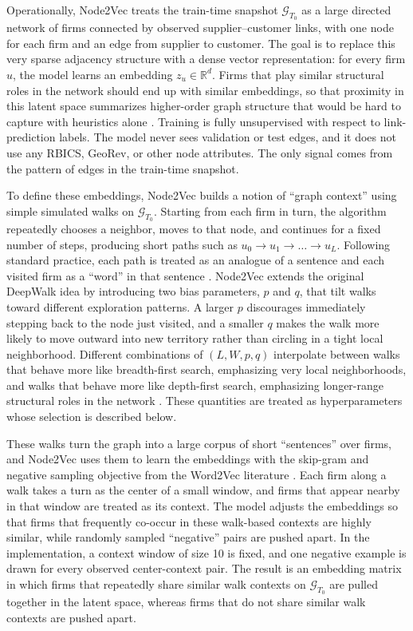 Operationally, Node2Vec treats the train-time snapshot \(\mathcal{G}_{T_0}\) as a large directed network of firms connected by observed supplier--customer links, with one node for each firm and an edge from supplier to customer. The goal is to replace this very sparse adjacency structure with a dense vector representation: for every firm \(u\), the model learns an embedding \(z_u \in \mathbb{R}^d\). Firms that play similar structural roles in the network should end up with similar embeddings, so that proximity in this latent space summarizes higher-order graph structure that would be hard to capture with heuristics alone \parencite{grover_node2vec_2016,hamilton_representation_2017,cai_comprehensive_2018}. Training is fully unsupervised with respect to link-prediction labels. The model never sees validation or test edges, and it does not use any RBICS, GeoRev, or other node attributes. The only signal comes from the pattern of edges in the train-time snapshot.

To define these embeddings, Node2Vec builds a notion of ``graph context'' using simple simulated walks on \(\mathcal{G}_{T_0}\). Starting from each firm in turn, the algorithm repeatedly chooses a neighbor, moves to that node, and continues for a fixed number of steps, producing short paths such as \(u_0 \rightarrow u_1 \rightarrow \dots \rightarrow u_L\). Following standard practice, each path is treated as an analogue of a sentence and each visited firm as a ``word'' in that sentence \parencite{perozzi_deepwalk_2014,grover_node2vec_2016}. Node2Vec extends the original DeepWalk idea by introducing two bias parameters, \(p\) and \(q\), that tilt walks toward different exploration patterns. A larger \(p\) discourages immediately stepping back to the node just visited, and a smaller \(q\) makes the walk more likely to move outward into new territory rather than circling in a tight local neighborhood. Different combinations of \((L, W, p, q)\) interpolate between walks that behave more like breadth-first search, emphasizing very local neighborhoods, and walks that behave more like depth-first search, emphasizing longer-range structural roles in the network \parencite{grover_node2vec_2016}. These quantities are treated as hyperparameters whose selection is described below.

These walks turn the graph into a large corpus of short ``sentences'' over firms, and Node2Vec uses them to learn the embeddings with the skip-gram and negative sampling objective from the Word2Vec literature \parencite{mikolov_distributed_2013,grover_node2vec_2016}. Each firm along a walk takes a turn as the center of a small window, and firms that appear nearby in that window are treated as its context. The model adjusts the embeddings so that firms that frequently co-occur in these walk-based contexts are highly similar, while randomly sampled ``negative'' pairs are pushed apart. In the implementation, a context window of size 10 is fixed, and one negative example is drawn for every observed center-context pair. The result is an embedding matrix in which firms that repeatedly share similar walk contexts on \(\mathcal{G}_{T_0}\) are pulled together in the latent space, whereas firms that do not share similar walk contexts are pushed apart.

